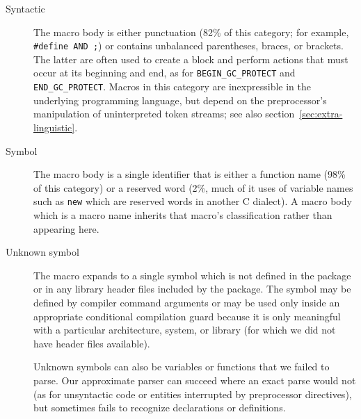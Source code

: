 \begin{description}
\item[Syntactic]  The macro body is either punctuation (82\% of this
  category; for example, {\tt \#define AND ;}) or contains unbalanced
  parentheses, braces, or brackets.  The latter are often used to create a
  block and perform actions that must occur at its beginning and end, as
  for \verb|BEGIN_GC_PROTECT| and \verb|END_GC_PROTECT|.
  Macros in this category are inexpressible in the underlying programming
  language, but depend on the preprocessor's manipulation of uninterpreted
  token streams; see also section~\ref{sec:extra-linguistic}.


\item[Symbol]
  The macro body is a single identifier that is either a function name
  (98\% of this category) or a reserved word (2\%, much of it uses of
  variable names such as {\tt new} which are reserved words in another
  C dialect).  A macro body which is a macro name inherits that macro's
  classification rather than appearing here.


\item[Unknown symbol]
  The macro expands to a single symbol which is not defined in the package
  or in any library header files included by the package.  The symbol may
  be defined by compiler command arguments or may be used only inside an
  appropriate conditional compilation guard because it is only meaningful
  with a particular architecture, system, or library (for which we did not
  have header files available).
  
  Unknown symbols can also be variables or functions that we failed to
  parse.  Our approximate parser can succeed where an exact parse would not
  (as for unsyntactic code or entities interrupted by preprocessor
  directives), but sometimes fails to recognize declarations or
  definitions.



\end{description}
